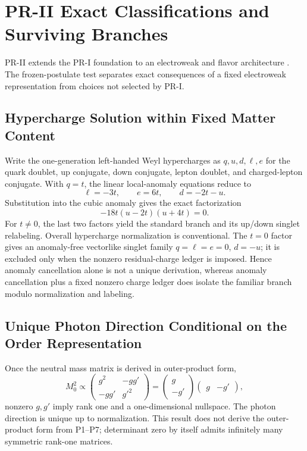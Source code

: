 \section{PR-II Exact Classifications and Surviving Branches}
\label{sec:pr2-branch-classification}

PR-II extends the PR-I foundation to an electroweak and flavor architecture \cite{PRII}.  The frozen-postulate test separates exact consequences of a fixed electroweak representation from choices not selected by PR-I.

\subsection{Hypercharge Solution within Fixed Matter Content}

Write the one-generation left-handed Weyl hypercharges \cite{Weinberg_QFT_1996} as $q,u,d,\ell,e$ for the quark doublet, up conjugate, down conjugate, lepton doublet, and charged-lepton conjugate.  With $q=t$, the linear local-anomaly equations reduce to
\begin{equation}
 \ell=-3t,\qquad e=6t,\qquad d=-2t-u.
\end{equation}
Substitution into the cubic anomaly gives the exact factorization
\begin{equation}
 -18t(u-2t)(u+4t)=0.
 \label{eq:pr35-hypercharge-factorization}
\end{equation}
For $t\ne0$, the last two factors yield the standard branch and its up/down singlet relabeling.  Overall hypercharge normalization is conventional.  The $t=0$ factor gives an anomaly-free vectorlike singlet family $q=\ell=e=0$, $d=-u$; it is excluded only when the nonzero residual-charge ledger is imposed.  Hence anomaly cancellation alone is not a unique derivation, whereas anomaly cancellation plus a fixed nonzero charge ledger does isolate the familiar branch modulo normalization and labeling.

\subsection{Unique Photon Direction Conditional on the Order Representation}

Once the neutral mass matrix is derived in outer-product form,
\begin{equation}
 M_0^2\propto
 \begin{pmatrix}g^2&-gg'\\-gg'&g'^2\end{pmatrix}
 =\begin{pmatrix}g\\-g'\end{pmatrix}
  \begin{pmatrix}g&-g'\end{pmatrix},
\end{equation}
nonzero $g,g'$ imply rank one and a one-dimensional nullspace.  The photon direction is unique up to normalization.  This result does not derive the outer-product form from P1--P7; determinant zero by itself admits infinitely many symmetric rank-one matrices.


